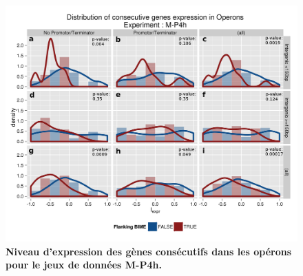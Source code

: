 \documentclass[12pt,a4paper]{report}
\begin{document}
\begin{figure}[!h]
\centerline{\includegraphics[scale=0.7]{figures/supData/genesOperon_histoDens_M-P4h.png}}
\caption{\textbf{Niveau d'expression des gènes consécutifs dans les opérons pour le jeux de données M-P4h.}}
\end{figure}
\end{document}
